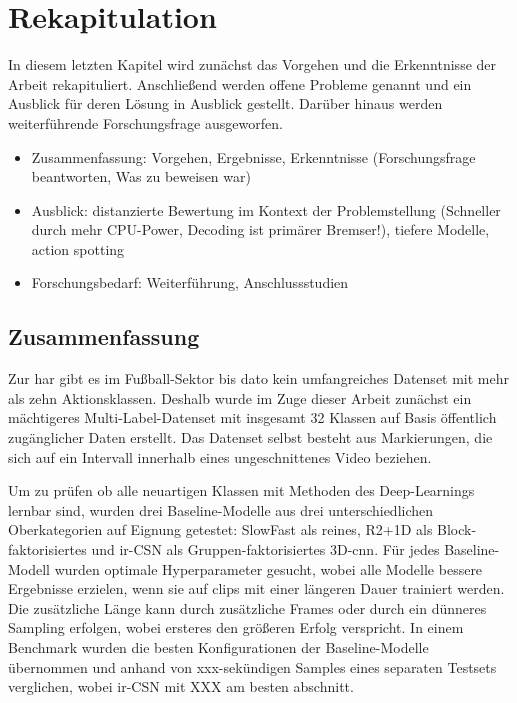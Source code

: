 \chapter{Rekapitulation}
\label{ch:zusammenfassung}

In diesem letzten Kapitel wird zunächst das Vorgehen und die Erkenntnisse der Arbeit rekapituliert.
Anschließend werden offene Probleme genannt und ein Ausblick für deren Lösung in Ausblick gestellt.
Darüber hinaus werden weiterführende Forschungsfrage ausgeworfen.

\begin{tcolorbox}[title=WIP]
 \begin{itemize}
  \item Zusammenfassung: Vorgehen, Ergebnisse, Erkenntnisse (Forschungsfrage beantworten, Was zu beweisen war)
  \item Ausblick: distanzierte Bewertung im Kontext der Problemstellung (Schneller durch mehr CPU-Power, Decoding ist primärer Bremser!), tiefere Modelle, action spotting
  \item Forschungsbedarf: Weiterführung, Anschlussstudien
 \end{itemize}
 \end{tcolorbox}

\section{Zusammenfassung}
\label{sec:rekapitulation}

Zur \gls{har} gibt es im Fußball-Sektor bis dato kein umfangreiches Datenset mit mehr als zehn Aktionsklassen.
Deshalb wurde im Zuge dieser Arbeit zunächst ein mächtigeres Multi-Label-Datenset mit insgesamt 32 Klassen auf Basis öffentlich zugänglicher Daten erstellt.
Das Datenset selbst besteht aus Markierungen, die sich auf ein Intervall innerhalb eines ungeschnittenes Video beziehen.

Um zu prüfen ob alle neuartigen Klassen mit Methoden des Deep-Learnings lernbar sind, wurden drei Baseline-Modelle aus drei unterschiedlichen Oberkategorien auf Eignung getestet:
SlowFast als reines, R2+1D als Block-faktorisiertes und ir-CSN als Gruppen-faktorisiertes 3D-\gls{cnn}.
Für jedes Baseline-Modell wurden optimale Hyperparameter gesucht, wobei alle Modelle bessere Ergebnisse erzielen, wenn sie auf \glspl{clip} mit einer längeren Dauer trainiert werden.
Die zusätzliche Länge kann durch zusätzliche Frames oder durch ein dünneres Sampling erfolgen, wobei ersteres den größeren Erfolg verspricht.
In einem Benchmark wurden die besten Konfigurationen der Baseline-Modelle übernommen und anhand von xxx-sekündigen Samples eines separaten Testsets verglichen, wobei ir-CSN mit XXX am besten abschnitt.

